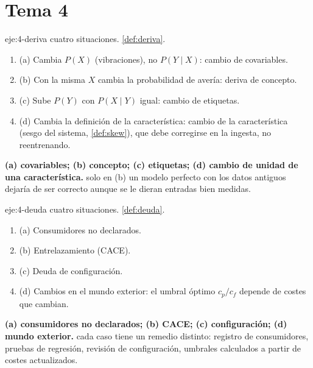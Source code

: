 \section{Tema 4}

\begin{solucion}{eje:4-deriva}
\datos cuatro situaciones.
\planteamiento \cref{def:deriva}.
\pasos
\begin{enumerate}[label=\arabic*.]
  \item (a) Cambia $P(X)$ (vibraciones), no $P(Y\mid X)$: cambio de covariables.
  \item (b) Con la misma $X$ cambia la probabilidad de avería: deriva de concepto.
  \item (c) Sube $P(Y)$ con $P(X\mid Y)$ igual: cambio de etiquetas.
  \item (d) Cambia la definición de la característica: cambio de la característica (sesgo del sistema, \cref{def:skew}), que debe corregirse en la ingesta, no reentrenando.
\end{enumerate}
\resultado \textbf{(a) covariables; (b) concepto; (c) etiquetas; (d) cambio de unidad de una característica.}
\comprobacion solo en (b) un modelo perfecto con los datos antiguos dejaría de ser correcto aunque se le dieran entradas bien medidas.
\end{solucion}

\begin{solucion}{eje:4-deuda}
\datos cuatro situaciones.
\planteamiento \cref{def:deuda}.
\pasos
\begin{enumerate}[label=\arabic*.]
  \item (a) Consumidores no declarados.
  \item (b) Entrelazamiento (CACE).
  \item (c) Deuda de configuración.
  \item (d) Cambios en el mundo exterior: el umbral óptimo $c_p/c_f$ depende de costes que cambian.
\end{enumerate}
\resultado \textbf{(a) consumidores no declarados; (b) CACE; (c) configuración; (d) mundo exterior.}
\comprobacion cada caso tiene un remedio distinto: registro de consumidores, pruebas de regresión, revisión de configuración, umbrales calculados a partir de costes actualizados.
\end{solucion}

